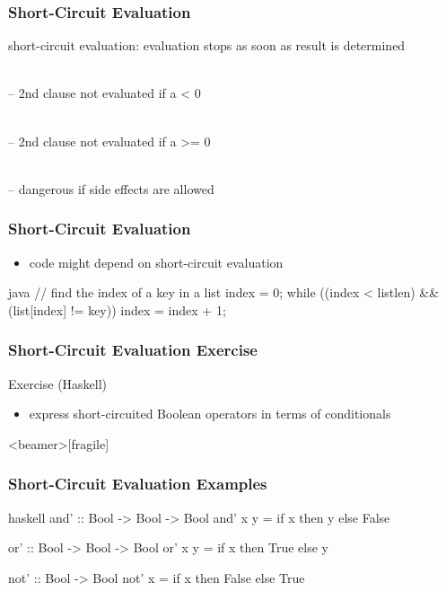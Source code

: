 \documentclass[dvipsnames]{beamer}
\theoremstyle{plain}
\begin{document}
\begin{frame}
  \frametitle{Short-Circuit Evaluation}

  \begin{definition}
    \alert{short-circuit evaluation}: evaluation stops
      as soon as result is determined
  \end{definition}

  \pause
  \begin{example}
    \\
    -- 2nd clause not evaluated if a < 0

    \bigskip
    \\
    -- 2nd clause not evaluated if a >= 0

    \pause
    \bigskip
    \\
    -- dangerous if side effects are allowed
  \end{example}
\end{frame}

\begin{frame}[fragile]
  \frametitle{Short-Circuit Evaluation}

  \begin{itemize}
    \item code might depend on short-circuit evaluation
  \end{itemize}

  \begin{example}[Java]
    \begin{pygments}{java}
// find the index of a key in a list
index = 0;
while ((index < listlen) && (list[index] != key))
    index = index + 1;
    \end{pygments}
  \end{example}
\end{frame}

\begin{frame}
  \frametitle{Short-Circuit Evaluation Exercise}

  \begin{block}{Exercise (Haskell)}
    \begin{itemize}
      \item express short-circuited Boolean operators in terms of conditionals
    \end{itemize}
  \end{block}
\end{frame}

\begin{frame}<beamer>[fragile]
  \frametitle{Short-Circuit Evaluation Examples}

  \begin{example}[Haskell]
    \begin{pygments}{haskell}
and' :: Bool -> Bool -> Bool
and' x y = if x then y else False

or' :: Bool -> Bool -> Bool
or' x y = if x then True else y

not' :: Bool -> Bool
not' x = if x then False else True
    \end{pygments}
  \end{example}
\end{frame}
\end{document}
